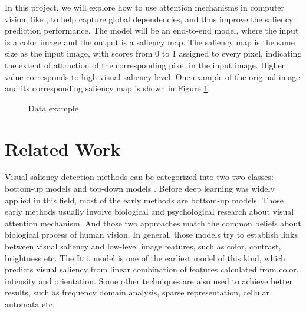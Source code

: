\documentclass[12pt]{article}
\begin{document}
In this project, we will explore how to use attention mechanisms in computer vision, like \cite{zhangSelfAttentionGenerativeAdversarial2019a},
to help capture global dependencies, and thus improve the saliency prediction performance. 
The model will be an end-to-end model, where the input is a color image and the output is a saliency map.
The saliency map is the same size as the input image, with scores from 0 to 1 assigned to 
every pixel, indicating the extent of attraction of the corresponding pixel in the input image.
Higher value corresponds to high visual saliency level.
One example of the original image and its corresponding saliency map is shown in Figure \ref{img:data_example}.
\begin{figure}[!h]
    \centering
    \hspace{5mm}
    \caption{Data example}
    \label{img:data_example}
\end{figure}


\section{Related Work}

Visual saliency detection methods can be categorized into two two classes: bottom-up models and top-down models \cite{congReviewVisualSaliency2019}.
Before deep learning was widely applied in this field, most of the early methods are bottom-up models.
Those early methods usually involve biological and psychological research about visual attention mechanism. And those two approaches match the common beliefs about biological process of human vision.
In general, those models try to establish links between visual saliency and low-level image features, such as color, contrast, brightness etc. The Itti. model\cite{ittiModelSaliencybasedVisual1998}
is one of the earliest model of this kind, which predicts visual saliency from linear combination of features calculated from color, intensity and orientation.
Some other techniques are also used to achieve better results, such as frequency domain analysis, sparse representation, cellular automata etc. \cite{congReviewVisualSaliency2019}
\end{document}
